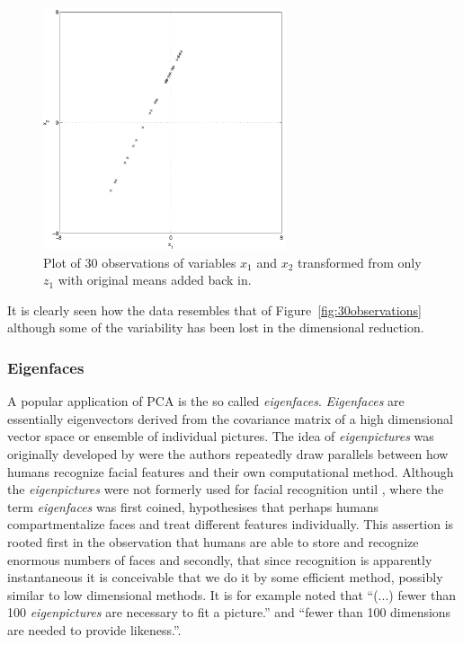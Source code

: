 \begin{figure}[!]
  \begin{center}
    \includegraphics[width=270px]{30observationsFinal.pdf}
    \caption{Plot of 30 observations of variables $x_1$ and $x_2$ transformed from only $z_1$ with original means added back in.}\label{fig:30observationsFinal}
  \end{center}
\end{figure}

It is clearly seen how the data resembles that of Figure~\ref{fig:30observations} although some of the variability has been lost in the dimensional reduction.

\subsubsection{Eigenfaces}
A popular application of PCA is the so called \emph{eigenfaces}. \emph{Eigenfaces} are essentially eigenvectors derived from the covariance matrix of a high dimensional vector space or ensemble of individual pictures. The idea of \emph{eigenpictures} was originally developed by \cite{Sirovich1987} were the authors repeatedly draw parallels between how humans recognize facial features and their own computational method. Although the \emph{eigenpictures} were not formerly used for facial recognition until \cite{Turk1991}, where the term \emph{eigenfaces} was first coined, \cite{Sirovich1987} hypothesises that perhaps humans compartmentalize faces and treat different features individually. This assertion is rooted first in the observation that humans are able to store and recognize enormous numbers of faces and secondly, that since recognition is apparently instantaneous it is conceivable that we do it by some efficient method, possibly similar to low dimensional methods. It is for example noted that ``(...) fewer than 100 \emph{eigenpictures} are necessary to fit a picture.'' and ``fewer than 100 dimensions are needed to provide likeness.''.

